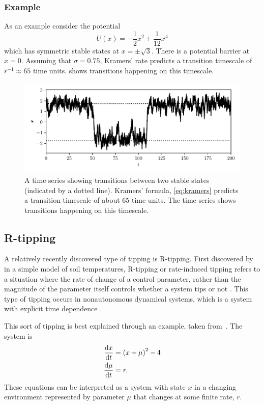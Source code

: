 \subsubsection{Example}
As an example consider the potential
\begin{equation}
  \label{eq:example_potential}
  U(x) = -\frac{1}{2}x^2 + \frac{1}{12}x^4
\end{equation}
which has symmetric stable states at $x = \pm \sqrt{3}$. There is a potential barrier at $x = 0$. Assuming that $\sigma = 0.75$, Kramers' rate predicts a transition
timescale of $r^{-1} \approx 65$ time units.  shows transitions happening on this timescale.

\begin{figure}
  \centering
  \includegraphics[width=\textwidth,keepaspectratio]{noise_trans}
  \caption[An example of N-tipping]{A time series showing transitions between two stable states (indicated by a dotted line). Kramers' formula, \cref{eq:kramers} predicts a
    transition timescale of about $65$ time units. The time series shows transitions happening on this timescale.}
  \label{fig:ntipping}
\end{figure}


\subsection{R-tipping}
A relatively recently discovered type of tipping is R-tipping. First discovered by~\cite{Luke2011} in a simple model of soil temperatures, R-tipping or rate-induced tipping refers to
a situation where the rate of change of a control parameter, rather than the magnitude of the parameter itself  controls whether a system tips or not \parencite{Wieczorek2011}.
This type of tipping occurs in nonautonomous dynamical systems, which is a system with explicit time dependence \parencite{Ashwin2017a}.

This sort of tipping is best explained through an example, taken from~\cite{Ashwin2012}. The system is
\begin{subequations}
  \label{eq:rtipping_example}
  \begin{align}
    \dv{x}{t}   &= \left(x + \mu\right)^2 - 4 \label{eq:rtipping_example_x} \\
    \dv{\mu}{t} &= r.                          \label{eq:rtipping_example_r} 
  \end{align}
\end{subequations}
These equations can be interpreted as a system with state $x$ in a changing environment represented by parameter $\mu$ that changes at some finite rate, $r$.

